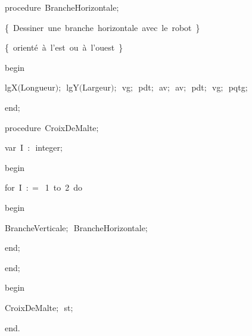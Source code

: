 {\pagebreak[3] 
\vspace{\neglskip}\mbox{\blc  \blk\idt  \mcl procedure\idt \ BrancheHorizontale$;$}\par 
\vspace{\neglskip}\mbox{\blc  \blk\blk\idt  \cmt  \{\ Dessiner\ une\ branche\ horizontale\ avec\ le\ robot\ \}\idt }\par 
\vspace{\neglskip}\mbox{\blc  \blk\blk\idt  \cmt  \{\ orienté\ à\ l{'}est\ ou\ à\ l{'}ouest\ \}\idt }\par 
\vspace{\neglskip}\mbox{\blc  \blk\idt  \mcl begin\idt }\par 
\vspace{\neglskip}\mbox{\blc  \blk\blk\idt  lgX$($Longueur$)$$;$\ lgY$($Largeur$)$$;$\ vg$;$\ pdt$;$\ av$;$\ av$;$\ pdt$;$\ vg$;$\ pqtg$;$}\par 
\vspace{\neglskip}\mbox{\blc  \blk\idt  \mcl end\idt $;$}\par 
\medskip

\pagebreak[3] 
\vspace{\neglskip}\mbox{\blc  \blk\idt  \mcl procedure\idt \ CroixDeMalte$;$}\par 
\pagebreak[3] 
\vspace{\neglskip}\mbox{\blc  \blk\blk\idt  \mcl var\idt \ I\ $:$\ integer$;$}\par 
\vspace{\neglskip}\mbox{\blc  \blk\idt  \mcl begin\idt }\par 
\pagebreak[3] 
\vspace{\neglskip}\mbox{\blc  \blk\blk\idt  \mcl for\idt \ I\ $:$$=$\ 1\ \mcl to\idt \ 2\ \mcl do\idt }\par 
\vspace{\neglskip}\mbox{\blc  \blk\blk\blk\idt  \mcl begin\idt }\par 
\vspace{\neglskip}\mbox{\blc  \blk\blk\blk\blk\idt  BrancheVerticale$;$\ BrancheHorizontale$;$}\par 
\vspace{\neglskip}\mbox{\blc  \blk\blk\blk\idt  \mcl end\idt $;$}\par 
\vspace{\neglskip}\mbox{\blc  \blk\idt  \mcl end\idt $;$}\par 
\medskip

\vspace{\neglskip}\mbox{\blc  \idt  \mcl begin\idt }\par 
\vspace{\neglskip}\mbox{\blc  \blk\idt  CroixDeMalte$;$\ st$;$}\par 
\vspace{\neglskip}\mbox{\blc  \idt  \mcl end\idt $.$}\par 

\medskip }

